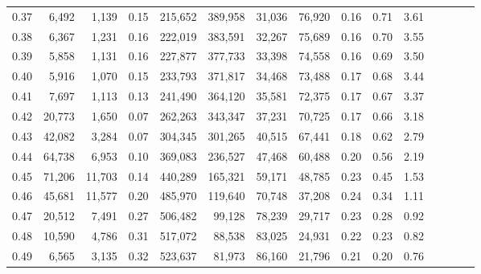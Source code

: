 \begin{tabular}{rrrcrrrrrrrrrrr}
0.37 &   6,492 &   1,139 &                                       0.15 &  215,652 &  389,958 &   31,036 &   76,920 &  0.16 &  0.71 &                         3.61 \\
0.38 &   6,367 &   1,231 &                                       0.16 &  222,019 &  383,591 &   32,267 &   75,689 &  0.16 &  0.70 &                         3.55 \\
0.39 &   5,858 &   1,131 &                                       0.16 &  227,877 &  377,733 &   33,398 &   74,558 &  0.16 &  0.69 &                         3.50 \\
0.40 &   5,916 &   1,070 &                                       0.15 &  233,793 &  371,817 &   34,468 &   73,488 &  0.17 &  0.68 &                         3.44 \\
0.41 &   7,697 &   1,113 &                                       0.13 &  241,490 &  364,120 &   35,581 &   72,375 &  0.17 &  0.67 &                         3.37 \\
0.42 &  20,773 &   1,650 &                                       0.07 &  262,263 &  343,347 &   37,231 &   70,725 &  0.17 &  0.66 &                         3.18 \\
0.43 &  42,082 &   3,284 &                                       0.07 &  304,345 &  301,265 &   40,515 &   67,441 &  0.18 &  0.62 &                         2.79 \\
0.44 &  64,738 &   6,953 &                                       0.10 &  369,083 &  236,527 &   47,468 &   60,488 &  0.20 &  0.56 &                         2.19 \\
0.45 &  71,206 &  11,703 &                                       0.14 &  440,289 &  165,321 &   59,171 &   48,785 &  0.23 &  0.45 &                         1.53 \\
0.46 &  45,681 &  11,577 &                                       0.20 &  485,970 &  119,640 &   70,748 &   37,208 &  0.24 &  0.34 &                         1.11 \\
0.47 &  20,512 &   7,491 &                                       0.27 &  506,482 &   99,128 &   78,239 &   29,717 &  0.23 &  0.28 &                         0.92 \\
0.48 &  10,590 &   4,786 &                                       0.31 &  517,072 &   88,538 &   83,025 &   24,931 &  0.22 &  0.23 &                         0.82 \\
0.49 &   6,565 &   3,135 &                                       0.32 &  523,637 &   81,973 &   86,160 &   21,796 &  0.21 &  0.20 &                         0.76 \\

\end{tabular}
